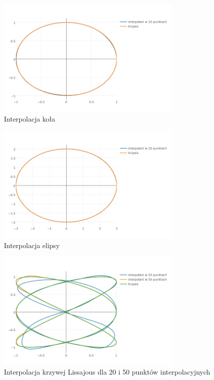 \documentclass[11pt,wide]{mwart}
\begin{document}
\begin{figure}[h]
    \centering
    \includegraphics[width=0.8\textwidth]{circle}
    \caption{Interpolacja koła}
    \label{fig:poland}
\end{figure}

\begin{figure}[h]
    \centering
    \includegraphics[width=0.8\textwidth]{ellipse}
    \caption{Interpolacja elipsy}
    \label{fig:ellipse}
\end{figure}

\begin{figure}[h]
    \centering
    \includegraphics[width=0.8\textwidth]{lissajous}
    \caption{Interpolacja krzywej Lissajous dla 20 i 50 punktów interpolacyjnych}
    \label{fig:lissajous}
\end{figure}
\end{document}
